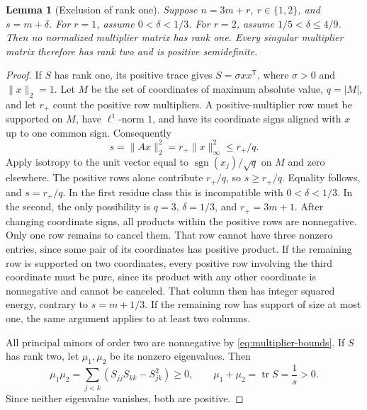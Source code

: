 \documentclass[11pt]{article}
\numberwithin{equation}{section}
\newtheorem{lemma}[lemma]{Lemma}
\theoremstyle{definition}
\theoremstyle{definition}
\newcommand{\norm}[1]{\lVert#1\rVert}
\DeclareMathOperator{\tr}{tr}
\begin{document}
\begin{lemma}[Exclusion of rank one]\label{lem:rank-one}
Suppose $n=3m+r$, $r\in\{1,2\}$, and $s=m+\delta$.
For $r=1$, assume $0<\delta<1/3$. For $r=2$, assume
$1/5<\delta\le4/9$. Then no normalized multiplier matrix has rank one.
Every singular multiplier matrix therefore has rank two and is positive
semidefinite.
\end{lemma}
\begin{proof}
If $S$ has rank one, its positive trace gives $S=\sigma xx^{\mathsf T}$,
where $\sigma>0$ and $\norm{x}_2=1$. Let $M$ be the set of coordinates
of maximum absolute value, $q=|M|$, and let $r_+$ count the positive
row multipliers. A positive-multiplier row must be supported on $M$,
have $\ell^1$-norm $1$, and have its coordinate signs aligned with $x$
up to one common sign. Consequently
\[
 s=\norm{Ax}_2^2=r_+\norm{x}_\infty^2\le r_+/q.
\]
Apply isotropy to the unit vector equal to $\operatorname{sgn}(x_j)/\sqrt q$
on $M$ and zero elsewhere. The positive rows alone contribute $r_+/q$,
so $s\ge r_+/q$. Equality follows, and $s=r_+/q$.
In the first residue class this is incompatible with $0<\delta<1/3$.
In the second, the only possibility is $q=3$, $\delta=1/3$, and
$r_+=3m+1$. After changing coordinate signs, all products within the
positive rows are nonnegative. Only one row remains to cancel them.
That row cannot have three nonzero entries, since some pair of its
coordinates has positive product. If the remaining row is supported on two coordinates, every positive
row involving the third coordinate must be pure, since its product
with any other coordinate is nonnegative and cannot be canceled.
That column then has integer squared energy, contrary to $s=m+1/3$.
If the remaining row has support of size at most one, the same argument
applies to at least two columns.

All principal minors of order two are nonnegative by
\eqref{eq:multiplier-bounds}. If $S$ has rank two, let $\mu_1,\mu_2$
be its nonzero eigenvalues. Then
\[
 \mu_1\mu_2=\sum_{j<k}(S_{jj}S_{kk}-S_{jk}^2)\ge0,
 \qquad \mu_1+\mu_2=\tr S=\frac1s>0.
\]
Since neither eigenvalue vanishes, both are positive.
\end{proof}
\end{document}
